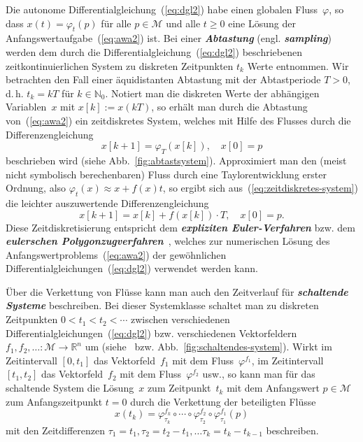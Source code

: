 \begin{remark}
\label{rem:Flussverkettung-zeitdiskret}Die autonome Differentialgleichung~(\ref{eq:dgl2})
habe einen globalen Fluss~$\varphi$, so dass $x(t)=\varphi_{t}(p)$
für alle $p\in\mathcal{M}$ und alle $t\geq0$ eine Lösung der Anfangswertaufgabe~(\ref{eq:awa2})
ist. Bei einer \textbf{\em Abtastung} (engl. \textbf{\em sampling})
werden dem durch die Differentialgleichung~(\ref{eq:dgl2}) beschriebenen
zeitkontinuierlichen System zu diskreten Zeitpunkten $t_{k}$ Werte
entnommen.
Wir betrachten den Fall einer äquidistanten Abtastung mit
der Abtastperiode $T>0$, d.\,h. $t_{k}=kT$ für $k\in{\mathbb{N}_0}$. Notiert
man die diskreten Werte der abhängigen Variablen~$x$ mit $x[k]:=x(kT)$,
so erhält man durch die Abtastung von~(\ref{eq:awa2}) ein zeitdiskretes
System, welches mit Hilfe des Flusses durch die Differenzengleichung
\begin{equation}
x[k+1]=\varphi_{T}(x[k]),\quad x[0]=p\label{eq:zeitdiskretes-system}
\end{equation}
beschrieben wird (siehe Abb.~\ref{fig:abtastsystem}).
Approximiert
man den (meist nicht symbolisch berechenbaren) Fluss durch eine Taylorentwicklung
erster Ordnung, also $\varphi_{t}(x)\approx x+f(x)t$, so ergibt sich
aus~(\ref{eq:zeitdiskretes-system}) die leichter auszuwertende Differenzengleichung
\[
x[k+1]=x[k]+f(x[k])\cdot T,\quad x[0]=p.
\]
Diese Zeitdiskretisierung entspricht dem \textbf{\em expliziten Euler-Verfahren}
bzw. dem \textbf{\em eulerschen Polygonzugverfahren}~\cite{bronstein2000,baerwolff2006},
welches zur numerischen Lösung des Anfangswertproblems~(\ref{eq:awa2})
der gewöhnlichen Differentialgleichungen~(\ref{eq:dgl2}) verwendet
werden kann.
\end{remark}

\begin{remark}
\label{rem:Flussverkettung-schaltende-Systeme}Über die Verkettung
von Flüsse kann man auch den Zeitverlauf für \textbf{\em schaltende Systeme}
beschreiben. Bei dieser Systemklasse schaltet man zu diskreten Zeitpunkten
$0<t_{1}<t_{2}<\cdots$ zwischen verschiedenen Differentialgleichungen~(\ref{eq:dgl2})
bzw. verschiedenen Vektorfeldern $f_{1},f_{2},\ldots:\mathcal{M}\to{\mathbb{R}}^{n}$
um (siehe~\cite{liberzon2003} bzw. Abb.~\ref{fig:schaltendes-system}).
Wirkt im Zeitintervall $[0,t_{1}]$ das Vektorfeld~$f_{1}$ mit dem
Fluss~$\varphi^{f_{1}}$, im Zeitintervall $[t_{1},t_{2}]$ das Vektorfeld~$f_{2}$
mit dem Fluss~$\varphi^{f_{2}}$ usw., so kann man für das schaltende
System die Lösung~$x$ zum Zeitpunkt~$t_{k}$ mit dem Anfangswert
$p\in\mathcal{M}$ zum Anfangszeitpunkt $t=0$ durch die Verkettung
der beteiligten Flüsse
\begin{equation}
x(t_{k})=\varphi_{\tau_{k}}^{f_{k}}\circ\cdots\circ\varphi_{\tau_{2}}^{f_{2}}\circ\varphi_{\tau_{1}}^{f_{1}}(p)\label{eq:verkettung-von-fluessen-geschaltet}
\end{equation}
mit den Zeitdifferenzen $\tau_{1}=t_{1},\tau_{2}=t_{2}-t_{1},\ldots\tau_{k}=t_{k}-t_{k-1}$
beschreiben.
\end{remark}


